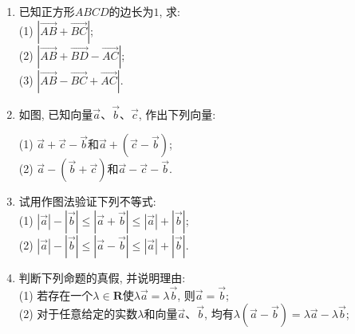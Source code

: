 \documentclass[10pt,a4paper]{article}
\begin{document}
\begin{enumerate}[1.]
\begin{center}
\end{center}
(1) 正北方向且模为$2$的向量$\overrightarrow{AE}$;\\
(2) 模为$2\sqrt 2$、方向为北偏西$45^\circ$的向量$\overrightarrow{BF}$;\\
(3) (2)中向量$BF$的负向量.
\item 已知正方形$ABCD$的边长为$1$, 求:\\
(1) $|\overrightarrow{AB}+\overrightarrow{BC}|$;\\
(2) $|\overrightarrow{AB}+\overrightarrow{BD}-\overrightarrow{AC}|$;\\
(3) $|\overrightarrow{AB}-\overrightarrow{BC}+\overrightarrow{AC}|$.
\item 如图, 已知向量$\overrightarrow a$、$\overrightarrow b$、$\overrightarrow c$, 作出下列向量:
\begin{center}
\end{center}
(1) $\overrightarrow a+\overrightarrow c-\overrightarrow b$和$\overrightarrow a+(\overrightarrow c-\overrightarrow b)$;\\
(2) $\overrightarrow a-(\overrightarrow b+\overrightarrow c)$和$\overrightarrow a-\overrightarrow c-\overrightarrow b$.
\item 试用作图法验证下列不等式:\\
(1) $|\overrightarrow a|-|\overrightarrow b|\le|\overrightarrow a+\overrightarrow b|\le|\overrightarrow a|+|\overrightarrow b|$;\\
(2) $|\overrightarrow a|-|\overrightarrow b|\le|\overrightarrow a-\overrightarrow b|\le|\overrightarrow a|+|\overrightarrow b|$.
\item 判断下列命题的真假, 并说明理由:\\
(1) 若存在一个$\lambda \in \mathbf{R}$使$\lambda \overrightarrow a=\lambda \overrightarrow b$, 则$\overrightarrow a=\overrightarrow b$;\\
(2) 对于任意给定的实数$\lambda$和向量$\overrightarrow a$、$\overrightarrow b$, 均有$\lambda (\overrightarrow a-\overrightarrow b)=\lambda \overrightarrow a-\lambda \overrightarrow b$;\\

\end{enumerate}
\end{document}
